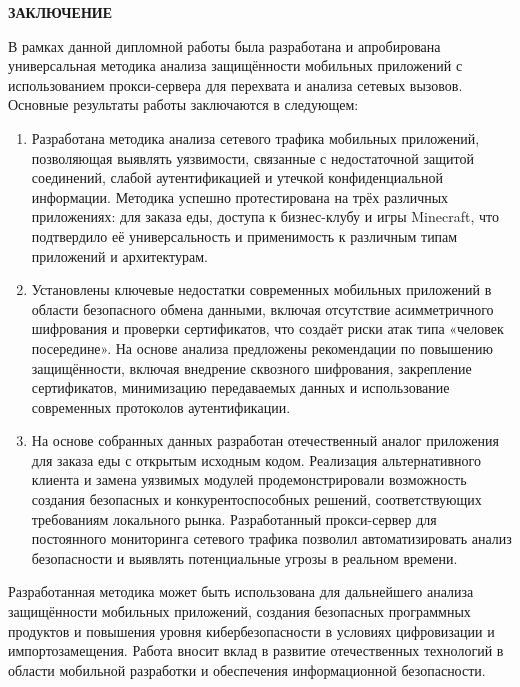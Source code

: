 \newpage
\begin{center}
  \textbf{\large ЗАКЛЮЧЕНИЕ}
\end{center}

В рамках данной дипломной работы была разработана и апробирована универсальная методика анализа защищённости мобильных приложений с использованием прокси-сервера для перехвата и анализа сетевых вызовов. Основные результаты работы заключаются в следующем:
\begin{enumerate}

\item Разработана методика анализа сетевого трафика мобильных приложений, позволяющая выявлять уязвимости, связанные с недостаточной защитой соединений, слабой аутентификацией и утечкой конфиденциальной информации. Методика успешно протестирована на трёх различных приложениях: для заказа еды, доступа к бизнес-клубу и игры Minecraft, что подтвердило её универсальность и применимость к различным типам приложений и архитектурам.

\item Установлены ключевые недостатки современных мобильных приложений в области безопасного обмена данными, включая отсутствие асимметричного шифрования и проверки сертификатов, что создаёт риски атак типа «человек посередине». На основе анализа предложены рекомендации по повышению защищённости, включая внедрение сквозного шифрования, закрепление сертификатов, минимизацию передаваемых данных и использование современных протоколов аутентификации.

\item На основе собранных данных разработан отечественный аналог приложения для заказа еды с открытым исходным кодом. Реализация альтернативного клиента и замена уязвимых модулей продемонстрировали возможность создания безопасных и конкурентоспособных решений, соответствующих требованиям локального рынка. Разработанный прокси-сервер для постоянного мониторинга сетевого трафика позволил автоматизировать анализ безопасности и выявлять потенциальные угрозы в реальном времени.


\end{enumerate}

Разработанная методика может быть использована для дальнейшего анализа защищённости мобильных приложений, создания безопасных программных продуктов и повышения уровня кибербезопасности в условиях цифровизации и импортозамещения. Работа вносит вклад в развитие отечественных технологий в области мобильной разработки и обеспечения информационной безопасности.
